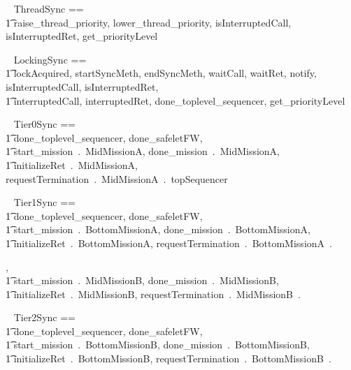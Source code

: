 %

\begin{circus}
\circchannelset ~ ThreadSync == \\ \t1  \lchanset raise\_thread\_priority, lower\_thread\_priority, isInterruptedCall, isInterruptedRet, get\_priorityLevel \rchanset
\end{circus}

\begin{circus}
\circchannelset ~ LockingSync == \\ \t1  \lchanset lockAcquired, startSyncMeth, endSyncMeth, waitCall, waitRet, notify, isInterruptedCall, isInterruptedRet, \\
\t1 interruptedCall, interruptedRet, done\_toplevel\_sequencer, get\_priorityLevel  \rchanset
\end{circus}

\begin{circus}
\circchannelset ~ Tier0Sync == \\
\t1 \lchanset
done\_toplevel\_sequencer, done\_safeletFW, \\
\t1 start\_mission~.~MidMissionA, done\_mission~.~MidMissionA,\\
\t1 initializeRet~.~MidMissionA,
requestTermination~.~MidMissionA~.~topSequencer


\rchanset
\end{circus}
%
\begin{circus}
\circchannelset ~ Tier1Sync == \\
\t1 \lchanset
done\_toplevel\_sequencer, done\_safeletFW, \\
\t1 start\_mission~.~BottomMissionA, done\_mission~.~BottomMissionA,\\
\t1 initializeRet~.~BottomMissionA,
requestTermination~.~BottomMissionA~.~

, \\
\t1 start\_mission~.~MidMissionB, done\_mission~.~MidMissionB,\\
\t1 initializeRet~.~MidMissionB,
requestTermination~.~MidMissionB~.~


\rchanset
\end{circus}
%
\begin{circus}
\circchannelset ~ Tier2Sync == \\
\t1 \lchanset
done\_toplevel\_sequencer, done\_safeletFW, \\
\t1 start\_mission~.~BottomMissionB, done\_mission~.~BottomMissionB,\\
\t1 initializeRet~.~BottomMissionB,
requestTermination~.~BottomMissionB~.~


\rchanset
\end{circus}
%
%
